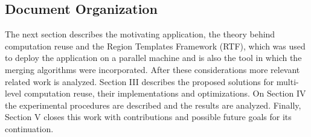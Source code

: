 \subsection{Document Organization}

The next section describes the motivating application, the theory behind computation reuse and the Region Templates Framework (RTF), which was used to deploy the application on a parallel machine and is also the tool in which the merging algorithms were incorporated. After these considerations more relevant related work is analyzed. Section III describes the proposed solutions for multi-level computation reuse, their implementations and optimizations. On Section IV the experimental procedures are described and the results are analyzed. Finally, Section V closes this work with contributions and possible future goals for its continuation.


